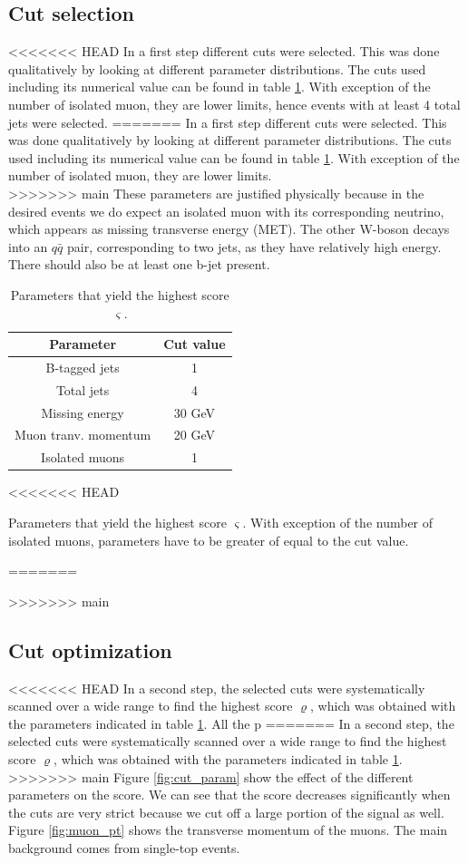 \documentclass[%
 reprint,
 amsmath,amssymb,
 aps,
]{revtex4-2}
\begin{document}
\subsection{Cut selection}
<<<<<<< HEAD
In a first step different cuts were selected. This was done qualitatively by looking at different parameter distributions. The cuts used including its numerical value can be found in table \ref{tab:optimal_params}. With exception of the number of isolated muon, they are lower limits, hence events with at least 4 total jets were selected. 
=======
In a first step different cuts were selected. This was done qualitatively by looking at different parameter distributions. The cuts used including its numerical value can be found in table \ref{tab:optimal_params}. With exception of the number of isolated muon, they are lower limits. \\
>>>>>>> main
These parameters are justified physically because in the desired events we do expect an isolated muon with its corresponding neutrino, which appears as missing transverse energy (MET). The other W-boson decays into an $q \bar q$ pair, corresponding to two jets, as they have relatively high energy. There should also be at least one b-jet present.  

\begin{table}[b]
    \centering
    \begin{tabular}{|c|c|}
    \hline
    Parameter            & Cut value \\
    \hline
    B-tagged jets        &  1 \\
    Total jets           &  4 \\
    Missing energy       &  30 GeV \\
    Muon tranv. momentum &  20 GeV \\
    Isolated muons       &  1 \\
    \hline
    \end{tabular}
<<<<<<< HEAD
    \caption{Parameters that yield the highest score $\varsigma$. With exception of the number of isolated muons, parameters have to be greater of equal to the cut value. }
=======
    \caption{Parameters that yield the highest score $\varsigma$. }
>>>>>>> main
    \label{tab:optimal_params}
\end{table}


\subsection{Cut optimization}
<<<<<<< HEAD
In a second step, the selected cuts were systematically scanned over a wide range to find the highest score $\varrho$, which was obtained with the parameters indicated in table \ref{tab:optimal_params}. All the p
=======
In a second step, the selected cuts were systematically scanned over a wide range to find the highest score $\varrho$, which was obtained with the parameters indicated in table \ref{tab:optimal_params}. 
>>>>>>> main
Figure \ref{fig:cut_param} show the effect of the different parameters on the score. We can see that the score decreases significantly when the cuts are very strict because we cut off a large portion of the signal as well. 
Figure \ref{fig:muon_pt} shows the transverse momentum of the muons. The main background comes from single-top events. 
\end{document}
